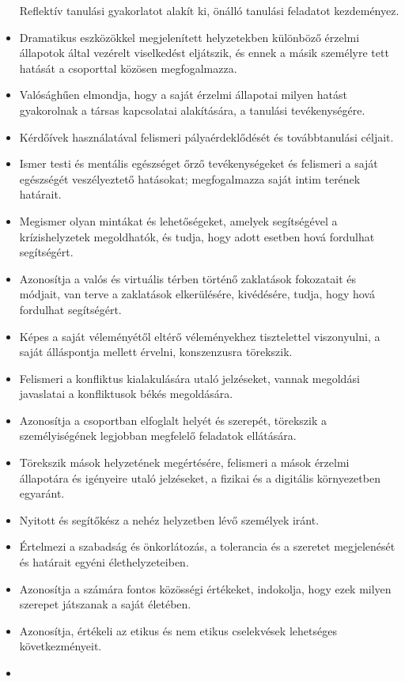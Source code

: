 \begin{itemize}
  Reflektív tanulási gyakorlatot alakít ki, önálló tanulási feladatot
  kezdeményez.
\item
  Dramatikus eszközökkel megjelenített helyzetekben különböző érzelmi
  állapotok által vezérelt viselkedést eljátszik, és ennek a másik
  személyre tett hatását a csoporttal közösen megfogalmazza.
\item
  Valósághűen elmondja, hogy a saját érzelmi állapotai milyen hatást
  gyakorolnak a társas kapcsolatai alakítására, a tanulási
  tevékenységére.
\item
  Kérdőívek használatával felismeri pályaérdeklődését és továbbtanulási
  céljait.
\item
  Ismer testi és mentális egészséget őrző tevékenységeket és felismeri a
  saját egészségét veszélyeztető hatásokat; megfogalmazza saját intim
  terének határait.
\item
  Megismer olyan mintákat és lehetőségeket, amelyek segítségével a
  krízishelyzetek megoldhatók, és tudja, hogy adott esetben hová
  fordulhat segítségért.
\item
  Azonosítja a valós és virtuális térben történő zaklatások fokozatait
  és módjait, van terve a zaklatások elkerülésére, kivédésére, tudja,
  hogy hová fordulhat segítségért.
\item
  Képes a saját véleményétől eltérő véleményekhez tisztelettel
  viszonyulni, a saját álláspontja mellett érvelni, konszenzusra
  törekszik.
\item
  Felismeri a konfliktus kialakulására utaló jelzéseket, vannak
  megoldási javaslatai a konfliktusok békés megoldására.
\item
  Azonosítja a csoportban elfoglalt helyét és szerepét, törekszik a
  személyiségének legjobban megfelelő feladatok ellátására.
\item
  Törekszik mások helyzetének megértésére, felismeri a mások érzelmi
  állapotára és igényeire utaló jelzéseket, a fizikai és a digitális
  környezetben egyaránt.
\item
  Nyitott és segítőkész a nehéz helyzetben lévő személyek iránt.
\item
  Értelmezi a szabadság és önkorlátozás, a tolerancia és a szeretet
  megjelenését és határait egyéni élethelyzeteiben.
\item
  Azonosítja a számára fontos közösségi értékeket, indokolja, hogy ezek
  milyen szerepet játszanak a saját életében.
\item
  Azonosítja, értékeli az etikus és nem etikus cselekvések lehetséges
  következményeit.
\item

\end{itemize}
